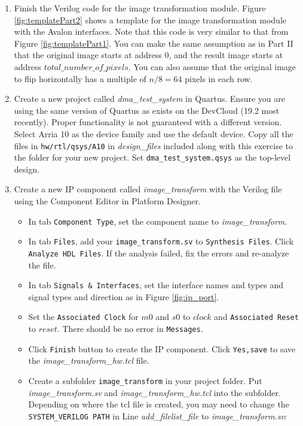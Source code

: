 \documentclass[epsfig,10pt,fullpage]{article}
\begin{document}
\begin{enumerate}
    \item Finish the Verilog code for the image transformation module. Figure \ref{fig:templatePart2} shows a template for the image transformation module with the Avalon interfaces. Note that this code is very similar to that from Figure \ref{fig:templatePart1}. You can make the same assumption as in Part II that the original image starts at address 0, and the result image starts at address $total\_number\_of\_pixels$. You can also assume that the original image to flip horizontally has a multiple of $n/8=64$ pixels in each row. 
    \item Create a new project called \emph{dma\_test\_system} in Quartus. Ensure you are using the same version of Quartus as exists on the DevCloud (19.2 most recently). Proper functionality is not guaranteed with a different version. Select Arria 10 as the device family and use the default device. Copy all the files in \texttt{hw/rtl/qsys/A10} in \emph{design\_files} included along with this exercise 
    to the folder for your new project. Set \texttt{dma\_test\_system.qsys} as the top-level design.
    \item Create a new IP component called \emph{image\_transform} with the Verilog file using the Component Editor in Platform Designer.
    \begin{itemize}
        \item In tab \texttt{Component Type}, set the component name to \emph{image\_transform}.
        \item In tab \texttt{Files}, add your \texttt{image\_transform.sv} to \texttt{Synthesis Files}. Click \texttt{Analyze HDL Files}. If the analysis failed, fix the errors and re-analyze the file.
        \item In tab \texttt{Signals \& Interfaces}, set the interface names and types and signal types and direction as in Figure \ref{fig:ip_port}. 
        \item Set the \texttt{Associated Clock} for $m0$ and $s0$ to $clock$ and \texttt{Associated Reset} to $reset$. There should be no error in \texttt{Messages}.
        \item Click \texttt{Finish} button to create the IP component. Click \texttt{Yes,save} to save the \emph{image\_transform\_hw.tcl} file.
        \item Create a subfolder \texttt{image\_transform} in your project folder. Put \emph{image\_transform.sv} and \emph{image\_transform\_hw.tcl} into the subfolder. Depending on where the tcl file is created, you may need to change the \texttt{SYSTEM\_VERILOG PATH} in Line \emph{add\_filelist\_file} to \emph{image\_transform.sv}:

\end{itemize}
\end{enumerate}
\end{document}
